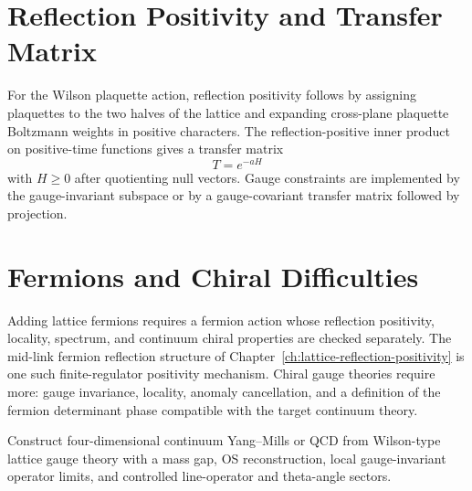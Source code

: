 \section{Reflection Positivity and Transfer Matrix}

For the Wilson plaquette action, reflection positivity follows by assigning
plaquettes to the two halves of the lattice and expanding cross-plane
plaquette Boltzmann weights in positive characters.  The reflection-positive
inner product on positive-time functions gives a transfer matrix
\[
  T=e^{-aH}
\]
with \(H\geq0\) after quotienting null vectors.  Gauge constraints are
implemented by the gauge-invariant subspace or by a gauge-covariant transfer
matrix followed by projection.

\section{Fermions and Chiral Difficulties}

Adding lattice fermions requires a fermion action whose reflection
positivity, locality, spectrum, and continuum chiral properties are checked
separately.  The mid-link fermion reflection structure of
Chapter~\ref{ch:lattice-reflection-positivity} is one such finite-regulator
positivity mechanism.  Chiral gauge theories require more: gauge invariance,
locality, anomaly cancellation, and a definition of the fermion determinant
phase compatible with the target continuum theory.

\begin{openproblem}
\label{op:lattice-continuum-qcd-construction}
Construct four-dimensional continuum Yang--Mills or QCD from Wilson-type
lattice gauge theory with a mass gap, OS reconstruction, local gauge-invariant
operator limits, and controlled line-operator and theta-angle sectors.
\end{openproblem}
